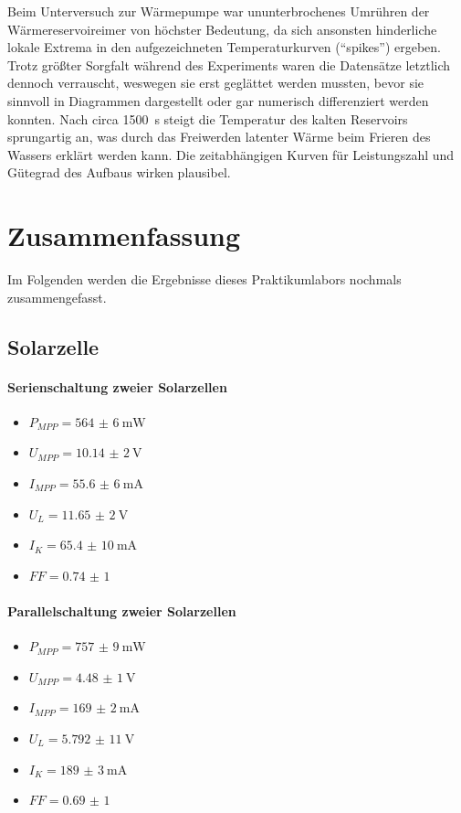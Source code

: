 \documentclass[english, ngerman]{scrartcl}
\begin{document}
Beim Unterversuch zur Wärmepumpe war ununterbrochenes Umrühren der Wärmereservoireimer von höchster Bedeutung, da sich ansonsten hinderliche lokale Extrema in den aufgezeichneten Temperaturkurven (\enquote{spikes}) ergeben. Trotz größter Sorgfalt während des Experiments waren die Datensätze letztlich dennoch verrauscht, weswegen sie erst geglättet werden mussten, bevor sie sinnvoll in Diagrammen dargestellt oder gar numerisch differenziert werden konnten. Nach circa \SI{1500}{s} steigt die Temperatur des kalten Reservoirs sprungartig an, was durch das Freiwerden latenter Wärme beim Frieren des Wassers erklärt werden kann. Die zeitabhängigen Kurven für Leistungszahl und Gütegrad des Aufbaus wirken plausibel.


\newpage
\section{Zusammenfassung}
\label{sec:zusammenfassung}

Im Folgenden werden die Ergebnisse dieses Praktikumlabors nochmals zusammengefasst.


\subsection{Solarzelle}
\label{subsec:zusammenfassung_solar}

\paragraph{Serienschaltung zweier Solarzellen}
\begin{itemize}
    \item $P_{MPP} = \SI{564(6)}{\milli\watt}$
    \item $U_{MPP} = \SI{10,14(2)}{\volt}$
    \item $I_{MPP} = \SI{55,6(6)}{\milli\ampere}$
    \item $U_{L} = \SI{11,65(2)}{\volt}$
    \item $I_{K} = \SI{65,4(10)}{\milli\ampere}$
    \item $FF = \num{0,74(1)}$
\end{itemize}

\paragraph{Parallelschaltung zweier Solarzellen}
\begin{itemize}
    \item $P_{MPP} = \SI{757(9)}{\milli\watt}$
    \item $U_{MPP} = \SI{4,48(1)}{\volt}$
    \item $I_{MPP} = \SI{169(2)}{\milli\ampere}$
    \item $U_{L} = \SI{5,792(11)}{\volt}$
    \item $I_{K} = \SI{189(3)}{\milli\ampere}$
    \item $FF = \num{0,69(1)}$
\end{itemize}
\end{document}
